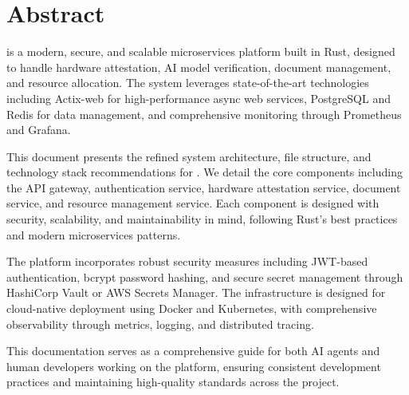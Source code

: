\section*{Abstract}

\sysname{} is a modern, secure, and scalable microservices platform built in Rust, designed to handle hardware attestation, AI model verification, document management, and resource allocation. The system leverages state-of-the-art technologies including Actix-web for high-performance async web services, PostgreSQL and Redis for data management, and comprehensive monitoring through Prometheus and Grafana.

This document presents the refined system architecture, file structure, and technology stack recommendations for \sysname{}. We detail the core components including the API gateway, authentication service, hardware attestation service, document service, and resource management service. Each component is designed with security, scalability, and maintainability in mind, following Rust's best practices and modern microservices patterns.

The platform incorporates robust security measures including JWT-based authentication, bcrypt password hashing, and secure secret management through HashiCorp Vault or AWS Secrets Manager. The infrastructure is designed for cloud-native deployment using Docker and Kubernetes, with comprehensive observability through metrics, logging, and distributed tracing.

This documentation serves as a comprehensive guide for both AI agents and human developers working on the \sysname{} platform, ensuring consistent development practices and maintaining high-quality standards across the project.
